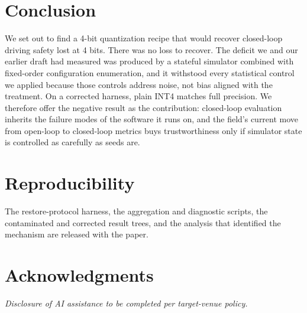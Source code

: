 \documentclass[conference]{IEEEtran}
\begin{document}
\section{Conclusion}
We set out to find a 4-bit quantization recipe that would recover closed-loop driving safety lost
at 4 bits. There was no loss to recover. The deficit we and our earlier draft had measured was
produced by a stateful simulator combined with fixed-order configuration enumeration, and it
withstood every statistical control we applied because those controls address noise, not bias
aligned with the treatment. On a corrected harness, plain INT4 matches full precision. We
therefore offer the negative result as the contribution: closed-loop evaluation inherits the
failure modes of the software it runs on, and the field's current move from open-loop to
closed-loop metrics buys trustworthiness only if simulator state is controlled as carefully as
seeds are.

\section*{Reproducibility}
The restore-protocol harness, the aggregation and diagnostic scripts, the contaminated and
corrected result trees, and the analysis that identified the mechanism are released with the
paper.

\section*{Acknowledgments}
\emph{Disclosure of AI assistance to be completed per target-venue policy.}
\end{document}
